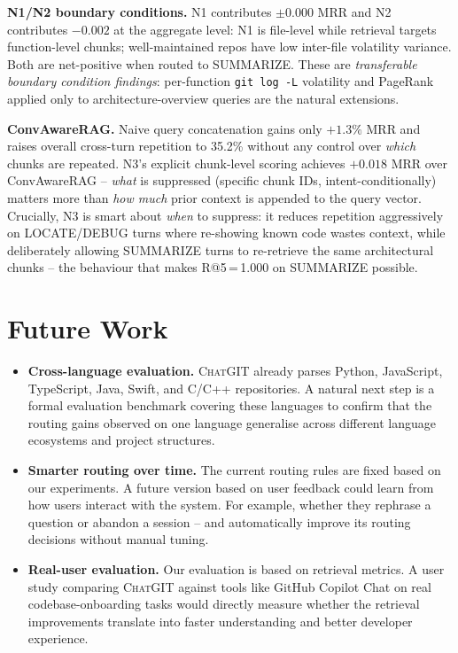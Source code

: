 \documentclass[conference]{IEEEtran}
\newcommand{\chatgit}{\textsc{ChatGIT}\xspace}
\begin{document}
\textbf{N1/N2 boundary conditions.} N1 contributes $\pm$0.000 MRR and
N2 contributes $-0.002$ at the aggregate level: N1 is file-level while
retrieval targets function-level chunks; well-maintained repos have low
inter-file volatility variance. Both are net-positive when routed to
SUMMARIZE. These are \emph{transferable boundary condition findings}:
per-function \texttt{git log -L} volatility and PageRank applied only
to architecture-overview queries are the natural extensions.

\textbf{ConvAwareRAG.} Naive query concatenation gains only $+1.3\%$
MRR and raises overall cross-turn repetition to 35.2\% without any
control over \emph{which} chunks are repeated. N3's explicit chunk-level
scoring achieves $+0.018$ MRR over ConvAwareRAG -- \emph{what} is
suppressed (specific chunk IDs, intent-conditionally) matters more than
\emph{how much} prior context is appended to the query vector. Crucially,
N3 is smart about \emph{when} to suppress: it reduces repetition
aggressively on LOCATE/DEBUG turns where re-showing known code wastes
context, while deliberately allowing SUMMARIZE turns to re-retrieve the
same architectural chunks -- the behaviour that makes R@5\,=\,1.000
on SUMMARIZE possible.

\section{Future Work}

\begin{itemize}
  \item \textbf{Cross-language evaluation.} \chatgit already parses
        Python, JavaScript, TypeScript, Java, Swift, and C/C++ repositories.
        A natural next step is a formal evaluation benchmark covering
        these languages to confirm that the routing gains observed on
        one language generalise across different language ecosystems and
        project structures.

 \item \textbf{Smarter routing over time.} The current routing rules
        are fixed based on our experiments. A future version based on user feedback could learn
        from how users interact with the system. For example, whether
        they rephrase a question or abandon a session -- and automatically
        improve its routing decisions without manual tuning.


  \item \textbf{Real-user evaluation.} Our evaluation is based on
        retrieval metrics. A user study comparing \chatgit against tools
        like GitHub Copilot Chat on real codebase-onboarding tasks would
        directly measure whether the retrieval improvements translate into
        faster understanding and better developer experience.
\end{itemize}
\end{document}
